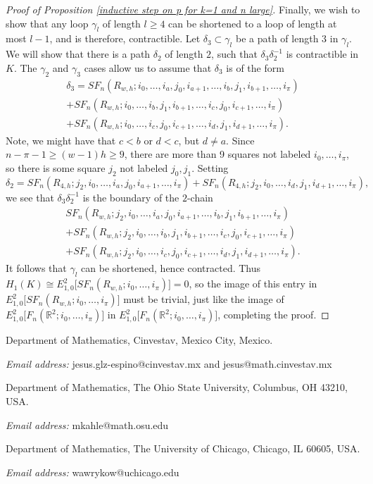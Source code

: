 \documentclass[pagebackref,colorlinks,citecolor=blue,linkcolor=blue,urlcolor=blue,filecolor=blue]{article}
\theoremstyle{definition}\newtheorem{definition}[thm]{Definition}
\theoremstyle{definition}
\newcommand{\R}{\ensuremath{\mathbb{R}}}
\begin{document}
\begin{proof}[Proof of Proposition \ref{inductive step on p for k=1 and n large}]
Finally, we wish to show that any loop $\gamma_{l}$ of length $l\ge 4$ can be shortened to a loop of length at most $l-1$, and is therefore, contractible. 
Let $\delta_{3}\subset \gamma_{l}$ be a path of length $3$ in $\gamma_{l}$.
We will show that there is a path $\delta_{2}$ of length $2$, such that $\delta_{3}\delta_{2}^{-1}$ is contractible in $K$.
The $\gamma_{2}$ and $\gamma_{3}$ cases allow us to assume that $\delta_{3}$ is of the form
\begin{multline*}
 \delta_{3}=SF_{n}(R_{w, h}; i_{0}, \dots, i_{a}, j_{0}, i_{a+1}, \dots, i_{b}, j_{1}, i_{b+1},\dots, i_{\pi})\\
 +SF_{n}(R_{w, h}; i_{0}, \dots, i_{b}, j_{1}, i_{b+1}, \dots, i_{c}, j_{0}, i_{c+1},\dots, i_{\pi})\\
 +SF_{n}(R_{w, h}; i_{0}, \dots, i_{c}, j_{0}, i_{c+1}, \dots, i_{d}, j_{1}, i_{d+1},\dots, i_{\pi}).
\end{multline*}
Note, we might have that $c<b$ or $d<c$, but $d\neq a$.
Since $n-\pi-1\ge (w-1)h\ge 9$, there are more than 9 squares not labeled $i_{0}, \dots, i_{\pi}$, so there is some square $j_{2}$ not labeled $j_{0}, j_{1}$.
Setting 
\[
\delta_{2}=SF_{n}(R_{4, h}; j_{2}, i_{0}, \dots, i_{a}, j_{0}, i_{a+1}, \dots, i_{\pi})+SF_{n}(R_{4, h}; j_{2}, i_{0}, \dots, i_{d}, j_{1}, i_{d+1}, \dots, i_{\pi}),
\]
we see that $\delta_{3}\delta_{2}^{-1}$ is the boundary of the $2$-chain
\begin{multline*}
 SF_{n}(R_{w, h}; j_{2}, i_{0}, \dots, i_{a}, j_{0}, i_{a+1}, \dots, i_{b}, j_{1}, i_{b+1},\dots, i_{\pi})\\
 +SF_{n}(R_{w, h}; j_{2}, i_{0}, \dots, i_{b}, j_{1}, i_{b+1}, \dots, i_{c}, j_{0}, i_{c+1},\dots, i_{\pi})\\
 +SF_{n}(R_{w, h}; j_{2}, i_{0}, \dots, i_{c}, j_{0}, i_{c+1}, \dots, i_{d}, j_{1}, i_{d+1},\dots, i_{\pi}).
\end{multline*}
It follows that $\gamma_{l}$ can be shortened, hence contracted.
Thus $H_{1}(K)\cong E^{2}_{1,0}\big[SF_{n}(R_{w, h}; i_{0}, \dots, i_{\pi})\big]=0$, so the image of this entry in $E^{2}_{1,0}\big[SF_{n}(R_{w, h}; i_{0}, \dots, i_{\pi})\big]$ must be trivial, just like the image of $E^{2}_{1,0}\big[F_{n}(\R^{2}; i_{0}, \dots, i_{\pi})\big]$ in $E^{2}_{1,0}\big[F_{n}(\R^{2}; i_{0}, \dots, i_{\pi})\big]$, completing the proof.
\end{proof}




\bigskip

Department of Mathematics, Cinvestav, Mexico City, Mexico.

\textit{Email address:} jesus.glz-espino@cinvestav.mx and jesus@math.cinvestav.mx

\medskip

Department of Mathematics, The Ohio State University, Columbus, OH 43210, USA.

\textit{Email address:} mkahle@math.osu.edu 

\medskip
Department of Mathematics, The University of Chicago, Chicago, IL 60605, USA.

\textit{Email address:} wawrykow@uchicago.edu
\end{document}
